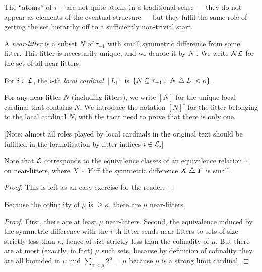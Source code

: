 The “atoms” of $\tau_{-1}$ are not quite atoms in a traditional sense — they do not appear as elements of the eventual structure — but they fulfil the same role of getting the set hierarchy off to a sufficiently non-trivial start.

\begin{definition}
\label {def:near-litter}
\leanok
{}
A \emph{near-litter} is a subset $N$ of $\tau_{-1}$ with small symmetric difference from some litter. This litter is necessarily unique, and we denote it by $N^\circ$.  We write $\mathcal{NL}$ for the set of all near-litters.
\end{definition}

\begin{definition}
\label {def:local-cardinal}
\leanok
For $i \in \mathcal{L}$, the $i$-th {\em local cardinal} $[L_i]$ is $\{N \subseteq \tau_{-1}:|N \mathrel{\triangle} L|<\kappa\}$.

For any near-litter $N$ (including litters), we write $[N]$ for the unique local cardinal that contains $N$. We introduce the notation $[N]^\circ$ for the litter belonging to the local cardinal $N$, with the tacit need to prove that there is only one.

[Note: almost all roles played by local cardinals in the original text should be fulfilled in the formalisation by litter-indices $i \in \mathcal{L}$.]
\end{definition}

\begin{lemma}
\label {lem:small-diff-equiv}
\leanok
{}
Note that $\mathcal{L}$ corresponds to the equivalence classes of an equivalence relation $\sim$ on near-litters, where $X \sim Y$ iff the symmetric difference $X \mathrel{\triangle} Y$ is small.
\end{lemma}

\begin{proof}
\leanok
This is left as an easy exercise for the reader.
\end{proof}

\begin{lemma}
\label {lem:count-near-litters}
\leanok
{}
Because the cofinality of $\mu$ is $\geq \kappa$, there are $\mu$ near-litters.
\end{lemma}

\begin{proof}
\leanok
First, there are at least $\mu$ near-litters. Second, the equivalence induced by the symmetric difference with the $i$-th litter sends near-litters to sets of size strictly less than $\kappa$, hence of size strictly less than the cofinality of $\mu$. But there are at most (exactly, in fact) $\mu$ such sets, because by definition of cofinality they are all bounded in $\mu$ and $\sum_{\alpha < \mu} 2 ^ \alpha = \mu $ because $\mu$ is a strong limit cardinal.
\end{proof}

